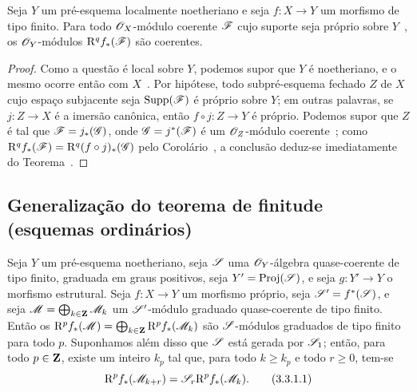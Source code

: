 \begin{corollary}[3.2.4]
\label{III.3.2.4}
Seja $Y$ um pré-esquema localmente noetheriano e seja $f:X\to Y$ um morfismo de tipo finito.
Para todo $\mathscr{O}_X$-módulo coerente $\mathscr{F}$ cujo suporte seja próprio sobre $Y$~, os $\mathscr{O}_Y$-módulos $\mathrm{R}^q f_*(\mathscr{F})$ são coerentes.
\end{corollary}

\begin{proof}
Como a questão é local sobre $Y$, podemos supor que $Y$ é noetheriano, e o mesmo ocorre então com $X$~.
Por hipótese, todo subpré-esquema fechado $Z$ de $X$ cujo espaço subjacente seja $\operatorname{Supp}(\mathscr{F})$ é próprio sobre $Y$; em outras palavras, se $j:Z\to X$ é a imersão canônica, então $f\circ j:Z\to Y$ é próprio.
Podemos supor que $Z$ é tal que $\mathscr{F}=j_*(\mathscr{G})$, onde $\mathscr{G}=j^*(\mathscr{F})$ é um $\mathscr{O}_Z$-módulo coerente~; como $\mathrm{R}^q f_*(\mathscr{F})=\mathrm{R}^q(f\circ j)_*(\mathscr{G})$ pelo Corolário~, a conclusão deduz-se imediatamente do Teorema~.
\end{proof}

\subsection{Generalização do teorema de finitude (esquemas ordinários)}
\label{subsection:III.3.3}

\begin{proposition}[3.3.1]
\label{III.3.3.1}
Seja $Y$ um pré-esquema noetheriano, seja $\mathscr{S}$ uma $\mathscr{O}_Y$-álgebra quase-coerente de tipo finito, graduada em graus positivos, seja $Y'=\operatorname{Proj}(\mathscr{S})$, e seja $g:Y'\to Y$ o morfismo estrutural.
Seja $f:X\to Y$ um morfismo próprio, seja $\mathscr{S}'=f^*(\mathscr{S})$, e seja $\mathscr{M}=\bigoplus_{k\in\mathbf{Z}}\mathscr{M}_k$ um $\mathscr{S}'$-módulo graduado quase-coerente de tipo finito.
Então os $\mathrm{R}^p f_*(\mathscr{M})=\bigoplus_{k\in\mathbf{Z}}\mathrm{R}^p f_*(\mathscr{M}_k)$ são $\mathscr{S}$-módulos graduados de tipo finito para todo $p$.
Suponhamos além disso que $\mathscr{S}$ está gerada por $\mathscr{S}_1$; então, para todo $p\in\mathbf{Z}$, existe um inteiro $k_p$ tal que, para todo $k\geq k_p$ e todo $r\geq 0$, tem-se
\[
\label{III.3.3.1.1}
  \RR^p f_*(\sh{M}_{k+r})=\sh{S}_r\RR^p f_*(\sh{M}_k).
  \tag{3.3.1.1}
\] 
\end{proposition}

